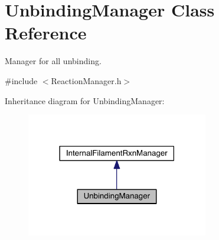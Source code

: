 \hypertarget{classUnbindingManager}{\section{Unbinding\+Manager Class Reference}
\label{classUnbindingManager}
}


Manager for all unbinding.  




{\ttfamily \#include $<$Reaction\+Manager.\+h$>$}



Inheritance diagram for Unbinding\+Manager\+:
\nopagebreak
\begin{figure}[H]
\begin{center}
\leavevmode
\includegraphics[width=225pt]{classUnbindingManager__inherit__graph}
\end{center}
\end{figure}


